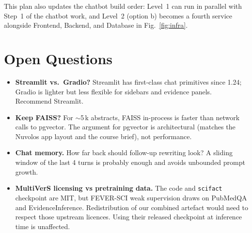 \documentclass[11pt,a4paper]{article}
\begin{document}
This plan also updates the chatbot build order: Level~1 can run in
parallel with Step~1 of the chatbot work, and Level~2 (option b) becomes
a fourth service alongside Frontend, Backend, and Database in
Fig.~\ref{fig:infra}.

\section{Open Questions}

\begin{itemize}
  \item \textbf{Streamlit vs.\ Gradio?} Streamlit has first-class chat
        primitives since 1.24; Gradio is lighter but less flexible for
        sidebars and evidence panels. Recommend Streamlit.
  \item \textbf{Keep FAISS?} For $\sim$5\,k abstracts, FAISS in-process
        is faster than network calls to pgvector. The argument for
        pgvector is architectural (matches the Nuvolos app layout and
        the course brief), not performance.
  \item \textbf{Chat memory.} How far back should follow-up rewriting
        look? A sliding window of the last 4 turns is probably enough
        and avoids unbounded prompt growth.
  \item \textbf{MultiVerS licensing vs pretraining data.} The code and
        \texttt{scifact} checkpoint are MIT, but FEVER-SCI weak
        supervision draws on PubMedQA and EvidenceInference. Redistribution
        of our combined artefact would need to respect those upstream
        licences. Using their released checkpoint at inference time is
        unaffected.
\end{itemize}
\end{document}
